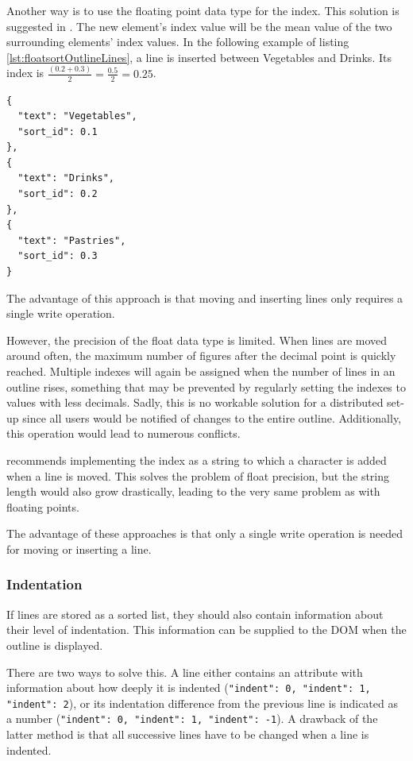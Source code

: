 Another way is to use the floating point data type for the index. This solution is suggested in . The new element's index value will be the mean value of the two surrounding elements' index values. In the following example of listing \ref{lst:floatsortOutlineLines}, a line is inserted between {\selectfont Vegetables} and {\selectfont Drinks}. Its index is $\frac{(0.2 + 0.3)}{2} = \frac{0.5}{2} = 0.25$.


\medskip
\begin{lstlisting}[caption=Three lines with a float index, label={lst:floatsortOutlineLines}]
{
  "text": "Vegetables",
  "sort_id": 0.1
},
{
  "text": "Drinks",
  "sort_id": 0.2
},
{
  "text": "Pastries",
  "sort_id": 0.3
}
\end{lstlisting}

The advantage of this approach is that moving and inserting lines only requires a single write operation.

However, the precision of the float data type is limited. When lines are moved around often, the maximum number of figures after the decimal point is quickly reached. Multiple indexes will again be assigned when the number of lines in an outline rises, something that may be prevented by regularly setting the indexes to values with less decimals. Sadly, this is no workable solution for a distributed set-up since all users would be notified of changes to the entire outline. Additionally, this operation would lead to numerous conflicts.

\cite{design:replication} recommends implementing the index as a string to which a character is added when a line is moved. This solves the problem of float precision, but the string length would also grow drastically, leading to the very same problem as with floating points.

The advantage of these approaches is that only a single write operation is needed for moving or inserting a line.


\subsubsection{Indentation}
\label{subsec:einrueckung}

If lines are stored as a sorted list, they should also contain information about their level of indentation. This information can be supplied to the DOM when the outline is displayed.

There are two ways to solve this. A line either contains an attribute with information about how deeply it is indented (\lstinline!"indent": 0, "indent": 1, "indent": 2!), or its indentation difference from the previous line is indicated as a number (\lstinline!"indent": 0, "indent": 1, "indent": -1!). A drawback of the latter method is that all successive lines have to be changed when a line is indented.

